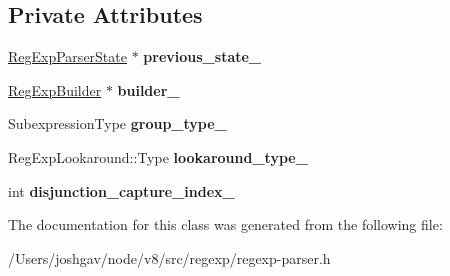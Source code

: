 \subsection*{Private Attributes}
\begin{DoxyCompactItemize}
\item 
\hyperlink{classv8_1_1internal_1_1_b_a_s_e___e_m_b_e_d_d_e_d_1_1_reg_exp_parser_state}{Reg\+Exp\+Parser\+State} $\ast$ {\bfseries previous\+\_\+state\+\_\+}\hypertarget{classv8_1_1internal_1_1_b_a_s_e___e_m_b_e_d_d_e_d_1_1_reg_exp_parser_state_afe09e6f2e079acf9b98d9bac57cfaba3}{}\label{classv8_1_1internal_1_1_b_a_s_e___e_m_b_e_d_d_e_d_1_1_reg_exp_parser_state_afe09e6f2e079acf9b98d9bac57cfaba3}

\item 
\hyperlink{classv8_1_1internal_1_1_reg_exp_builder}{Reg\+Exp\+Builder} $\ast$ {\bfseries builder\+\_\+}\hypertarget{classv8_1_1internal_1_1_b_a_s_e___e_m_b_e_d_d_e_d_1_1_reg_exp_parser_state_a2542a07bf83f3f38083f197becc13556}{}\label{classv8_1_1internal_1_1_b_a_s_e___e_m_b_e_d_d_e_d_1_1_reg_exp_parser_state_a2542a07bf83f3f38083f197becc13556}

\item 
Subexpression\+Type {\bfseries group\+\_\+type\+\_\+}\hypertarget{classv8_1_1internal_1_1_b_a_s_e___e_m_b_e_d_d_e_d_1_1_reg_exp_parser_state_a2efa10e7cbd7da6bdd429bf03173d5a7}{}\label{classv8_1_1internal_1_1_b_a_s_e___e_m_b_e_d_d_e_d_1_1_reg_exp_parser_state_a2efa10e7cbd7da6bdd429bf03173d5a7}

\item 
Reg\+Exp\+Lookaround\+::\+Type {\bfseries lookaround\+\_\+type\+\_\+}\hypertarget{classv8_1_1internal_1_1_b_a_s_e___e_m_b_e_d_d_e_d_1_1_reg_exp_parser_state_af1f9d547e4c5d32ea4ca1d66302c793c}{}\label{classv8_1_1internal_1_1_b_a_s_e___e_m_b_e_d_d_e_d_1_1_reg_exp_parser_state_af1f9d547e4c5d32ea4ca1d66302c793c}

\item 
int {\bfseries disjunction\+\_\+capture\+\_\+index\+\_\+}\hypertarget{classv8_1_1internal_1_1_b_a_s_e___e_m_b_e_d_d_e_d_1_1_reg_exp_parser_state_af4dd5627dcd2ee371baba198f9f042f2}{}\label{classv8_1_1internal_1_1_b_a_s_e___e_m_b_e_d_d_e_d_1_1_reg_exp_parser_state_af4dd5627dcd2ee371baba198f9f042f2}

\end{DoxyCompactItemize}


The documentation for this class was generated from the following file\+:\begin{DoxyCompactItemize}
\item 
/\+Users/joshgav/node/v8/src/regexp/regexp-\/parser.\+h\end{DoxyCompactItemize}
